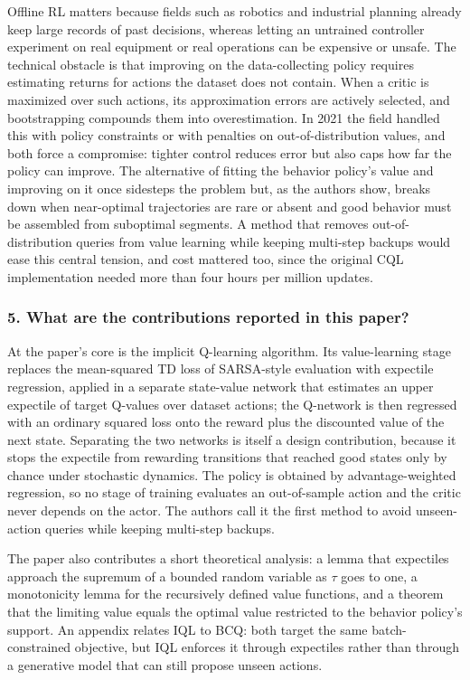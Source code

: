 \documentclass[11pt]{article}
\newcommand{\question}[1]{\subsubsection*{#1}}
\begin{document}
Offline RL matters because fields such as robotics and industrial planning already keep large records of past decisions, whereas letting an untrained controller experiment on real equipment or real operations can be expensive or unsafe. The technical obstacle is that improving on the data-collecting policy requires estimating returns for actions the dataset does not contain. When a critic is maximized over such actions, its approximation errors are actively selected, and bootstrapping compounds them into overestimation. In 2021 the field handled this with policy constraints or with penalties on out-of-distribution values, and both force a compromise: tighter control reduces error but also caps how far the policy can improve. The alternative of fitting the behavior policy's value and improving on it once sidesteps the problem but, as the authors show, breaks down when near-optimal trajectories are rare or absent and good behavior must be assembled from suboptimal segments. A method that removes out-of-distribution queries from value learning while keeping multi-step backups would ease this central tension, and cost mattered too, since the original CQL implementation needed more than four hours per million updates.

\question{5. What are the contributions reported in this paper?}

At the paper's core is the implicit Q-learning algorithm. Its value-learning stage replaces the mean-squared TD loss of SARSA-style evaluation with expectile regression, applied in a separate state-value network that estimates an upper expectile of target Q-values over dataset actions; the Q-network is then regressed with an ordinary squared loss onto the reward plus the discounted value of the next state. Separating the two networks is itself a design contribution, because it stops the expectile from rewarding transitions that reached good states only by chance under stochastic dynamics. The policy is obtained by advantage-weighted regression, so no stage of training evaluates an out-of-sample action and the critic never depends on the actor. The authors call it the first method to avoid unseen-action queries while keeping multi-step backups.

The paper also contributes a short theoretical analysis: a lemma that expectiles approach the supremum of a bounded random variable as \ensuremath{\tau} goes to one, a monotonicity lemma for the recursively defined value functions, and a theorem that the limiting value equals the optimal value restricted to the behavior policy's support. An appendix relates IQL to BCQ: both target the same batch-constrained objective, but IQL enforces it through expectiles rather than through a generative model that can still propose unseen actions.
\end{document}
